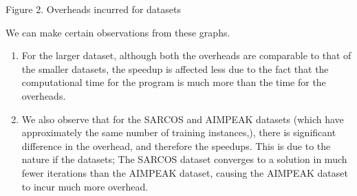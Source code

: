 \documentclass[12pt]{article}
\begin{document}
\centerline{Figure 2. Overheads incurred for datasets}
\newline\newline
We can make certain observations from these graphs.
\begin{enumerate}[label=(\alph*)]
\item For the larger dataset, although both the overheads are comparable to that of the smaller datasets, the speedup is affected less due to the fact that the computational time for the program is much more than the time for the overheads.
\item We also observe that for the SARCOS and AIMPEAK datasets (which have approximately the same number of training instances,), there is significant difference in the overhead, and therefore the speedups. This is due to the nature if the datasets; The SARCOS dataset converges to a solution in much fewer iterations than the AIMPEAK dataset, causing the AIMPEAK dataset to incur much more overhead.
\end{enumerate}
\end{document}
